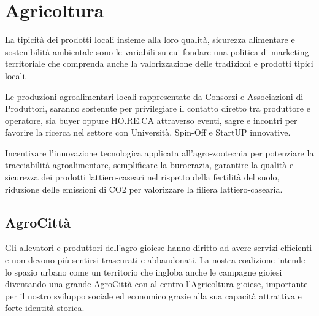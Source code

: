 \documentclass[a4paper,14pt,italian]{sphinxmanual}
\begin{document}



\chapter{Agricoltura}
\label{\detokenize{agricoltura:agricoltura}}\label{\detokenize{agricoltura::doc}}


La tipicità dei prodotti locali insieme alla loro qualità, sicurezza alimentare e sostenibilità ambientale sono le variabili su cui fondare una politica di marketing territoriale che comprenda anche la valorizzazione delle tradizioni e prodotti tipici locali.

Le produzioni agroalimentari locali rappresentate da Consorzi e Associazioni di Produttori, saranno sostenute per privilegiare il contatto diretto tra produttore e operatore, sia buyer oppure HO.RE.CA attraverso eventi, sagre e incontri per favorire la ricerca nel settore con Università, Spin-Off e StartUP innovative.

Incentivare l’innovazione tecnologica applicata all’agro-zootecnia per potenziare la tracciabilità agroalimentare, semplificare la burocrazia, garantire la qualità e sicurezza dei prodotti lattiero-caseari nel rispetto della fertilità del suolo, riduzione delle emissioni di CO2 per valorizzare la filiera lattiero-casearia.


\section{AgroCittà}
\label{\detokenize{agricoltura:agrocitta}}
Gli allevatori e produttori dell’agro gioiese hanno diritto ad avere servizi efficienti e non devono più sentirsi trascurati e abbandonati.
La nostra coalizione intende lo spazio urbano come un territorio che ingloba anche le campagne gioiesi diventando una grande AgroCittà con al centro l’Agricoltura gioiese, importante per il nostro sviluppo sociale ed economico grazie alla sua capacità attrattiva e forte identità storica.
\end{document}
